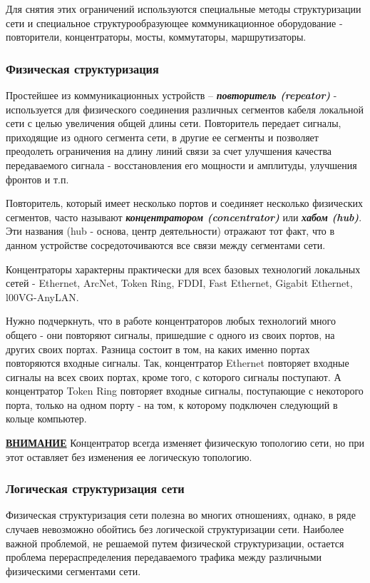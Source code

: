 Для снятия этих ограничений используются специальные методы структуризации сети и специальное структурообразующее коммуникационное оборудование - повторители, концентраторы, мосты, коммутаторы, маршрутизаторы.

\subsubsection{Физическая структуризация}
Простейшее из коммуникационных устройств – \textbf{\textit{повторитель (repeator)}} - используется для физического соединения различных сегментов кабеля локальной сети с целью увеличения общей длины сети.
Повторитель передает сигналы, приходящие из одного сегмента сети, в другие ее сегменты и позволяет преодолеть ограничения на длину линий связи за счет улучшения качества передаваемого сигнала - восстановления его мощности и амплитуды, улучшения фронтов и т.п.

Повторитель, который имеет несколько портов и соединяет несколько физических сегментов, часто называют \textbf{\textit{концентратором (concentrator)}} или \textbf{\textit{хабом (hub)}}.
Эти названия (hub - основа, центр деятельности) отражают тот факт, что в данном устройстве сосредоточиваются все связи между сегментами сети.

Концентраторы характерны практически для всех базовых технологий локальных сетей - Ethernet, ArcNet, Token Ring, FDDI, Fast Ethernet, Gigabit Ethernet, l00VG-AnyLAN.

Нужно подчеркнуть, что в работе концентраторов любых технологий много общего - они повторяют сигналы, пришедшие с одного из своих портов, на других своих портах.
Разница состоит в том, на каких именно портах повторяются входные сигналы.
Так, концентратор Ethernet повторяет входные сигналы на всех своих портах, кроме того, с которого сигналы поступают.
А концентратор Token Ring повторяет входные сигналы, поступающие с некоторого порта, только на одном порту - на том, к которому подключен следующий в кольце компьютер.

\textbf{\underline{ВНИМАНИЕ}} Концентратор всегда изменяет физическую топологию сети, но при этот оставляет без изменения ее логическую топологию.

\subsubsection{Логическая структуризация сети}

Физическая структуризация сети полезна во многих отношениях, однако, в ряде случаев невозможно обойтись без логической структуризации сети.
Наиболее важной проблемой, не решаемой путем физической структуризации, остается проблема перераспределения передаваемого трафика между различными физическими сегментами сети.

